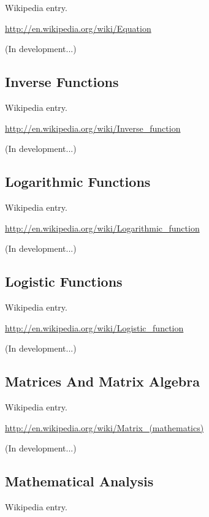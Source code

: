 \documentclass[12pt,oneside]{book}
\begin{document}
Wikipedia entry.

\href{http://en.wikipedia.org/wiki/Equation}{http://en.wikipedia.org/wiki/Equation}

(In development...)

\subsection[Inverse Functions]{Inverse Functions}

Wikipedia entry.

\href{http://en.wikipedia.org/wiki/Inverse_function}{http://en.wikipedia.org/wiki/Inverse\_function}

(In development...)

\subsection[Logarithmic Functions]{Logarithmic Functions}

Wikipedia entry.

\href{http://en.wikipedia.org/wiki/Logarithmic_function}{http://en.wikipedia.org/wiki/Logarithmic\_function}

(In development...)

\subsection[Logistic Functions]{Logistic Functions}

Wikipedia entry.

\href{http://en.wikipedia.org/wiki/Logistic_function}{http://en.wikipedia.org/wiki/Logistic\_function}

(In development...)

\subsection[Matrices And Matrix Algebra]{Matrices And Matrix Algebra}

Wikipedia entry.

\href{http://en.wikipedia.org/wiki/Matrix_(mathematics)}{http://en.wikipedia.org/wiki/Matrix\_(mathematics)}

(In development...)

\subsection[Mathematical Analysis]{Mathematical Analysis}

Wikipedia entry.
\end{document}
